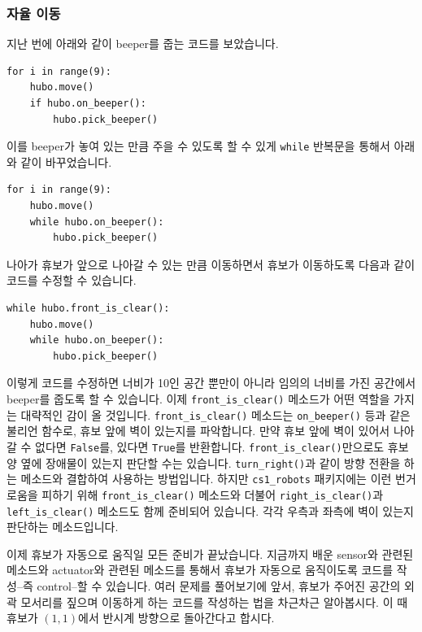 \documentclass[../main.tex]{subfiles}
\begin{document}
\subsubsection{자율 이동}
지난 번에 아래와 같이 beeper를 줍는 코드를 보았습니다.
\begin{verbatim}
for i in range(9):
	hubo.move()
	if hubo.on_beeper():
		hubo.pick_beeper()
\end{verbatim}
이를 beeper가 놓여 있는 만큼 주을 수 있도록 할 수 있게 \texttt{while} 반복문을 통해서 아래와 같이 바꾸었습니다.
\begin{verbatim}
for i in range(9):
	hubo.move()
	while hubo.on_beeper():
		hubo.pick_beeper()
\end{verbatim}
나아가 휴보가 앞으로 나아갈 수 있는 만큼 이동하면서 휴보가 이동하도록 다음과 같이 코드를 수정할 수 있습니다.
\begin{verbatim}
while hubo.front_is_clear():
	hubo.move()
	while hubo.on_beeper():
		hubo.pick_beeper()
\end{verbatim}
이렇게 코드를 수정하면 너비가 10인 공간 뿐만이 아니라 임의의 너비를 가진 공간에서 beeper를 줍도록 할 수 있습니다.
이제 \texttt{front\_is\_clear()} 메소드가 어떤 역할을 가지는 대략적인 감이 올 것입니다.
\texttt{front\_is\_clear()} 메소드는 \texttt{on\_beeper()} 등과 같은 불리언 함수로, 휴보 앞에 벽이 있는지를 파악합니다.
만약 휴보 앞에 벽이 있어서 나아갈 수 없다면 \texttt{False}를, 있다면 \texttt{True}를 반환합니다.
\texttt{front\_is\_clear()}만으로도 휴보 양 옆에 장애물이 있는지 판단할 수는 있습니다.
\texttt{turn\_right()}과 같이 방향 전환을 하는 메소드와 결합하여 사용하는 방법입니다.
하지만 \texttt{cs1\_robots} 패키지에는 이런 번거로움을 피하기 위해 \texttt{front\_is\_clear()} 메소드와 더불어 \texttt{right\_is\_clear()}과 \texttt{left\_is\_clear()} 메소드도 함께 준비되어 있습니다.
각각 우측과 좌측에 벽이 있는지 판단하는 메소드입니다.

이제 휴보가 자동으로 움직일 모든 준비가 끝났습니다.
지금까지 배운 sensor와 관련된 메소드와 actuator와 관련된 메소드를 통해서 휴보가 자동으로 움직이도록 코드를 작성--즉 control--할 수 있습니다.
여러 문제를 풀어보기에 앞서, 휴보가 주어진 공간의 외곽 모서리를 짚으며 이동하게 하는 코드를 작성하는 법을 차근차근 알아봅시다.
이 때 휴보가 $(1, 1)$에서 반시계 방향으로 돌아간다고 합시다.
\end{document}
